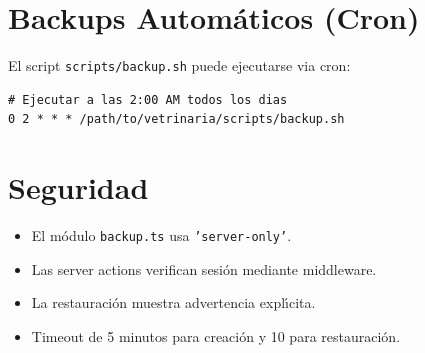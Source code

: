 \section{Backups Autom\'aticos (Cron)}

El script \texttt{scripts/backup.sh} puede ejecutarse via cron:

\begin{lstlisting}[style=bash, caption=Programar backup diario]
# Ejecutar a las 2:00 AM todos los dias
0 2 * * * /path/to/vetrinaria/scripts/backup.sh
\end{lstlisting}

\section{Seguridad}

\begin{itemize}[leftmargin=*]
    \item El m\'odulo \texttt{backup.ts} usa \texttt{'server-only'}.
    \item Las server actions verifican sesi\'on mediante middleware.
    \item La restauraci\'on muestra advertencia expl\'{\i}cita.
    \item Timeout de 5 minutos para creaci\'on y 10 para restauraci\'on.
\end{itemize}
